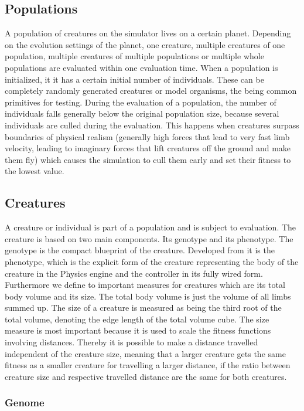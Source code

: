 \documentclass[main]{subfiles}
\begin{document}
\subsection{Populations}

A population of creatures on the simulator lives on a certain planet. Depending on the evolution settings of the planet, one creature, multiple creatures of one population, multiple creatures of multiple populations or multiple whole populations are evaluated within one evaluation time. When a population is initialized, it it has a certain initial number of individuals. These can be completely randomly generated creatures or model organisms, the being common primitives for testing. During the evaluation of a population, the number of individuals falls generally below the original population size, because several individuals are culled during the evaluation. This happens when creatures surpass boundaries of physical realism (generally high forces that lead to very fast limb velocity, leading to imaginary forces that lift creatures off the ground and make them fly) which causes the simulation to cull them early and set their fitness to the lowest value. 

\subsection{Creatures}

A creature or individual is part of a population and is subject to evaluation. The creature is based on two main components. Its genotype and its phenotype. The genotype is the compact blueprint of the creature. Developed from it is the phenotype, which is the explicit form of the creature representing the body of the creature in the Physics engine and the controller in its fully wired form. Furthermore we define to important measures for creatures which are its total body volume and its size. The total body volume is just the volume of all limbs summed up. The size of a creature is measured as being the third root of the total volume, denoting the edge length of the total volume cube. The size measure is most important because it is used to scale the fitness functions involving distances. Thereby it is possible to make a distance travelled independent of the creature size, meaning that a larger creature gets the same fitness as a smaller creature for travelling a larger distance, if the ratio between creature size and respective travelled distance are the same for both creatures.

\subsubsection{Genome}
\end{document}
